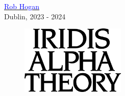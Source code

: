 \href{https://mastodon.social/@mwenge}{\textcolor{blue}{Rob Hogan}}\\
Dublin, 2023 - 2024 \\

\clearpage
\vspace*{\fill}
\begin{figure}[H]
    \centering
      \includegraphics[width=5cm]{src/cover/title_page.png}%
\end{figure}
\vspace*{\fill}
\thispagestyle{empty}%
\clearpage

